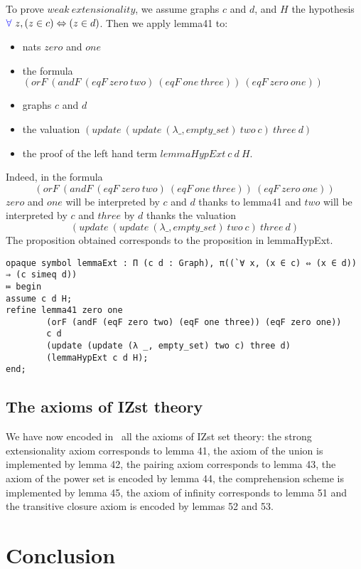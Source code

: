 \documentclass[a4paper]{article}
\begin{document}
To prove $weak \ extensionality$, we assume graphs $c$ and $d$, and $H$ the hypothesis ${\color{blue} \forall}~z, (z \in c) \Leftrightarrow (z \in d)$. Then we apply lemma41 to:

\begin{itemize}
\item nats $zero$ and $one$
\item the formula $(orF~(andF~(eqF~zero~two)~(eqF~one~three))~(eqF~zero~one))$
\item graphs $c$ and $d$
\item the valuation $(update~(update~(\lambda \_, empty\_set)~two~c)~three~d)$ 
\item the proof of the left hand term $lemmaHypExt~c~d~H$.
\end{itemize}

Indeed, in the formula $$(orF~(andF~(eqF~zero~two)~(eqF~one~three))~(eqF~zero~one))$$ $zero$ and $one$ will be interpreted by $c$ and $d$ thanks to lemma41 and $two$ will be interpreted by $c$ and $three$ by $d$ thanks the valuation $$(update~(update~(\lambda \_, empty\_set)~two~c)~three~d)$$ The proposition obtained corresponds to the proposition in lemmaHypExt.


\begin{lstlisting}
opaque symbol lemmaExt : Π (c d : Graph), π((`∀ x, (x ∈ c) ⇔ (x ∈ d)) ⇒ (c simeq d))
≔ begin
assume c d H;
refine lemma41 zero one 
		(orF (andF (eqF zero two) (eqF one three)) (eqF zero one)) 
		c d 
		(update (update (λ _, empty_set) two c) three d) 
		(lemmaHypExt c d H);
end;
\end{lstlisting}

\subsection{The axioms of IZst theory}

We have now encoded in \dedukti ~all the axioms of IZst set theory: the strong extensionality axiom corresponds to lemma 41, the axiom of the union is implemented by lemma 42, the pairing axiom corresponds to lemma 43, the axiom of the power set is encoded by lemma 44, the comprehension scheme is implemented by lemma 45, the axiom of infinity corresponds to lemma 51 and the transitive closure axiom is encoded by lemmas 52 and 53.


\section{Conclusion}
\end{document}
